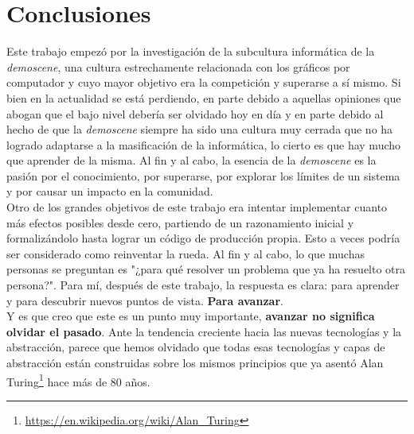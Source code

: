 
\chapter{Conclusiones}

Este trabajo empezó por la investigación de la subcultura informática de la \emph{demoscene}, una cultura estrechamente relacionada con los gráficos por computador y cuyo mayor objetivo era la competición y superarse a sí mismo. Si bien en la actualidad se está perdiendo, en parte debido a aquellas opiniones que abogan que el bajo nivel debería ser olvidado hoy en día y en parte debido al hecho de que la \emph{demoscene} siempre ha sido una cultura muy cerrada que no ha logrado adaptarse a la masificación de la informática, lo cierto es que hay mucho que aprender de la misma. Al fin y al cabo, la esencia de la \emph{demoscene} es la pasión por el conocimiento, por superarse, por explorar los límites de un sistema y por causar un impacto en la comunidad.\\

Otro de los grandes objetivos de este trabajo era intentar implementar cuanto más efectos posibles desde cero, partiendo de un razonamiento inicial y formalizándolo hasta lograr un código de producción propia. Esto a veces podría ser considerado como reinventar la rueda. Al fin y al cabo, lo que muchas personas se preguntan es "¿para qué resolver un problema que ya ha resuelto otra persona?". Para mí, después de este trabajo, la respuesta es clara: para aprender y para descubrir nuevos puntos de vista. \textbf{Para avanzar}.\\

Y es que creo que este es un punto muy importante, \textbf{avanzar no significa olvidar el pasado}. Ante la tendencia creciente hacia las nuevas tecnologías y la abstracción, parece que hemos olvidado que todas esas tecnologías y capas de abstracción están construidas sobre los mismos principios que ya asentó Alan Turing\footnote{\url{https://en.wikipedia.org/wiki/Alan_Turing}} hace más de 80 años.\\

